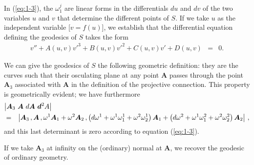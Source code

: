 In (\ref{eq:1-3}), the $\omega^j_1$ are linear forms in the differentials  $du$ and $dv$ of the two variables $u$ and $v$ that determine the different points of $S$. If we take $u$ as the independent variable [$v=f(u)$], we establish that the differential equation defining the geodesics of $S$ takes the form 
\begin{eqnarray*}
v'' + A(u,v) v'^3 + B(u,v) v'^2 + C(u,v) v' + D(u,v) &=& 0.
\end{eqnarray*}

We can give the geodesics of $S$ the following geometric definition: they are the curves such that their osculating plane at any point $\bm A$ passes through the point $\bm A_3$ associated with $\bm A$ in the definition of the projective connection. This property is geometrically evident; we have furthermore
\begin{eqnarray*}
\lefteqn{
\left| \bm A_3\ \bm A\ d\bm A\ \bm d^2A \right|
 } \\ &=& 
  \left| \bm A_3\, , \bm A\, , \omega^1 \bm A_1 + \omega^2 \bm A_2 \, , \left(d\omega^1 + \omega^1 \omega^1_1 + \omega^2 \omega^1_2 \right) \bm A_1 + \left( d\omega^2 + \omega^1 \omega^2_1 + \omega^2 \omega^2_2 \right) \bm A_2
 \right|\, ,
\end{eqnarray*}
and this last determinant is zero according to equation (\ref{eq:1-3}).

If we take $\bm A_3$ at infinity on the (ordinary) normal at $\bm A$, we recover the geodesic of ordinary geometry. 








































































